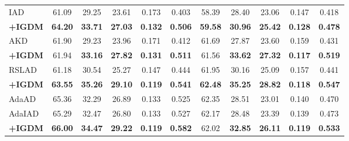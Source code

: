 \documentclass{article} %
\begin{document}
\begin{table}[h]
\begin{tabular}{lcccccccccc}
 IAD & 61.09 & 29.25 & 23.61 & 0.173& 0.403 & 58.39 & 28.40 & 23.06 & 0.147 
& 0.418
\\
 \textbf{+IGDM} & \textbf{64.20} & \textbf{33.71} & \textbf{27.03} & \textbf{0.132}& \textbf{0.506} & \textbf{59.58} & \textbf{30.96} & \textbf{25.42} & \textbf{0.128} 
& 
\textbf{0.478}
\\
 \midrule
 AKD & 61.90& 29.23& 23.96& 0.171& 0.412& 61.69& 27.87& 23.60& 0.159& 0.431\\
 \textbf{+IGDM} & 61.94& \textbf{33.16}& \textbf{27.82}&\textbf{ 0.131}& \textbf{0.511}& 
 61.56 & \textbf{33.62} & \textbf{27.32} & \textbf{0.117} & \textbf{0.519} 
\\
 \midrule
 RSLAD & 61.18 & 30.54 & 25.27 & 0.147&0.444 & 61.95 & 30.16 & 25.09 & 0.157 
& 0.441\\
 \textbf{+IGDM} & \textbf{63.55} & \textbf{35.26} & \textbf{29.10} & \textbf{0.119} & \textbf{0.541} & 
\textbf{62.48} & \textbf{35.25} & \textbf{28.82} & 
\textbf{0.118} 
& 
\textbf{0.547}\\
 \midrule
 AdaAD &65.36& 32.29 & 26.89 & 0.133& 0.525 & 62.35 & 28.51 & 23.01 & 0.140 
& 0.470\\
 AdaIAD & 65.29& 32.47& 26.80& 0.133& 0.527& 
62.17& 28.48& 23.39& 0.139& 
0.473\\
 \textbf{+IGDM} & \textbf{66.00} & \textbf{34.47} & \textbf{29.22} & \textbf{0.119}& \textbf{0.582} & 62.02 & \textbf{32.85} & \textbf{26.11} & \textbf{0.119} & \textbf{0.533}\\
\bottomrule
 \end{tabular}
 \label{tab:ikl_at_cifar100}
  \vspace{-0.5cm}
\end{table}
\end{document}
